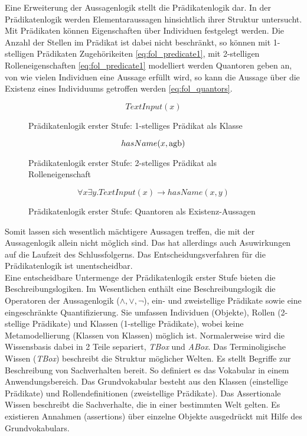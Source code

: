 \documentclass[runningheads,a4paper]{llncs}
\begin{document}
Eine Erweiterung der Aussagenlogik stellt die Prädikatenlogik dar.
In der Prädikatenlogik werden Elementaraussagen hinsichtlich ihrer Struktur untersucht.
Mit Prädikaten können Eigenschaften über Individuen festgelegt werden. 
Die Anzahl der Stellen im Prädikat ist dabei nicht beschränkt, so können mit 1-stelligen Prädikaten Zugehörikeiten \eqref{eq:fol_predicate1}, mit 2-stelligen Rolleneigenschaften \eqref{eq:fol_predicate1} modelliert werden  
Quantoren geben an, von wie vielen Individuen eine Aussage erfüllt wird, so kann die Aussage über die Existenz eines Individuums getroffen werden \eqref{eq:fol_quantors}.
\begin{figure}
\begin{equation}
TextInput(x)
\label{eq:fol_predicate1}
\end{equation}
\caption{Prädikatenlogik erster Stufe: 1-stelliges Prädikat als Klasse}
\end{figure}

\begin{figure}
\begin{equation}
hasName(x, \textnormal{agb})
\label{eq:fol_predicate2}
\end{equation}
\caption{Prädikatenlogik erster Stufe: 2-stelliges Prädikat als Rolleneigenschaft}
\end{figure}

\begin{figure}
\begin{equation}
\forall x\exists y. TextInput(x) \to hasName(x, y)
\label{eq:fol_quantors}
\end{equation}
\caption{Prädikatenlogik erster Stufe: Quantoren als Existenz-Aussagen}
\end{figure}

Somit lassen sich wesentlich mächtigere Aussagen treffen, die mit der Aussagenlogik allein nicht möglich sind.
Das hat allerdings auch Asuwirkungen auf die Laufzeit des Schlussfolgerns.
Das Entscheidungsverfahren für die Prädikatenlogik ist unentscheidbar. 
\\

Eine entscheidbare Untermenge der Prädikatenlogik erster Stufe bieten die Beschreibungslogiken.
Im Wesentlichen enthält eine Beschreibungslogik die Operatoren der Aussagenlogik (\(\land, \lor, \neg\)), ein- und zweistellige Prädikate sowie eine eingeschränkte Quantifizierung.
Sie umfassen Individuen (Objekte), Rollen (2-stellige Prädikate) und Klassen (1-stellige Prädikate), wobei keine Metamodellierung (Klassen von Klassen) möglich ist.
Normalerweise wird die Wissensbasis dabei in 2 Teile separiert, \textit{TBox} und \textit{ABox}. 
Das Terminoligische Wissen (\textit{TBox}) beschreibt die Struktur möglicher Welten. 
Es stellt Begriffe zur Beschreibung von Sachverhalten bereit. 
So definiert es das Vokabular in einem Anwendungsbereich. 
Das Grundvokabular besteht aus den Klassen (einstellige Prädikate) und Rollendefinitionen (zweistellige Prädikate). 
Das Assertionale Wissen beschreibt die Sachverhalte, die in einer bestimmten Welt gelten. 
Es existieren Annahmen (assertions) über einzelne Objekte ausgedrückt mit
Hilfe des Grundvokabulars.
\end{document}
